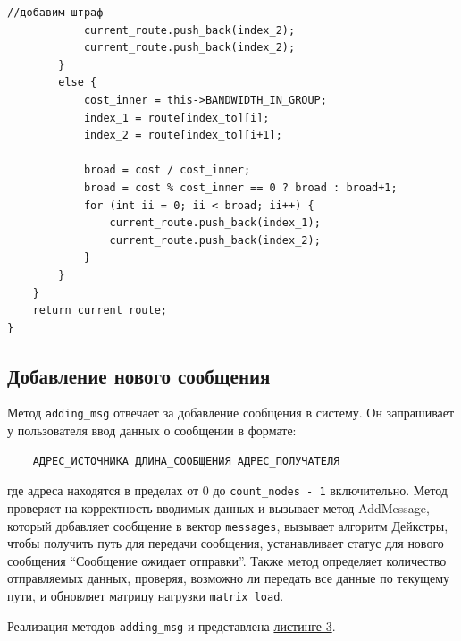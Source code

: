 \documentclass[11pt,a4paper,final]{article} %
\begin{document}
\begin{lstlisting}[label=lst2, caption = {Модифицированный алгоритм Дейкстры}]
			//добавим штраф
			current_route.push_back(index_2);
			current_route.push_back(index_2);
		}
		else {
			cost_inner = this->BANDWIDTH_IN_GROUP;
			index_1 = route[index_to][i];
			index_2 = route[index_to][i+1];
			
			broad = cost / cost_inner;
			broad = cost % cost_inner == 0 ? broad : broad+1;
			for (int ii = 0; ii < broad; ii++) {
				current_route.push_back(index_1);
				current_route.push_back(index_2);
			}
		}
	}
	return current_route;
}

\end{lstlisting}


\subsection{Добавление нового сообщения}
Метод \texttt{adding\_msg} отвечает за добавление сообщения в систему. Он запрашивает у пользователя ввод данных о сообщении в формате:
\begin{verbatim}
	АДРЕС_ИСТОЧНИКА ДЛИНА_СООБЩЕНИЯ АДРЕС_ПОЛУЧАТЕЛЯ
\end{verbatim}

где адреса находятся в пределах от 0 до \texttt{count\_nodes - 1} включительно.
Метод проверяет на корректность вводимых данных и вызывает метод AddMessage, который добавляет сообщение в вектор \texttt{messages}, вызывает алгоритм Дейкстры, чтобы получить путь для передачи сообщения, устанавливает статус для нового сообщения ``Сообщение ожидает отправки''. Также метод определяет количество отправляемых данных, проверяя, возможно ли передать все данные по текущему пути, и обновляет матрицу нагрузки \texttt{matrix\_load}.

Реализация методов \texttt{adding\_msg} и   представлена \hyperref[lst3]{листинге 3}.
\end{document}
